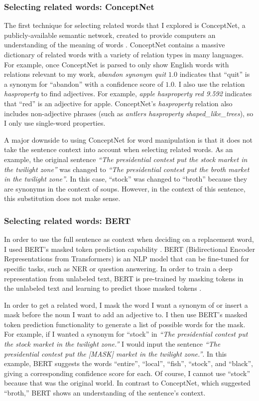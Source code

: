 \subsubsection{Selecting related words: ConceptNet}
The first technique for selecting related words that I explored is ConceptNet, a publicly-available semantic network, created to provide computers an understanding of the meaning of words \citep{conceptnet}. ConceptNet contains a massive dictionary of related words with a variety of relation types in many languages. For example, once ConceptNet is parsed to only show English words with relations relevant to my work, \textit{abandon synonym quit $1.0$} indicates that ``quit'' is a synonym for ``abandon'' with a confidence score of $1.0$. I also use the relation \textit{hasproperty} to find adjectives. For example, \textit{apple hasproperty red 9.592} indicates that ``red'' is an adjective for apple. ConceptNet's \textit{hasproperty} relation also includes non-adjective phrases (such as \textit{antlers hasproperty shaped\_like\_trees}), so I only use single-word properties.

A major downside to using ConceptNet for word manipulation is that it does not take the sentence context into account when selecting related words. As an example, the original sentence \textit{``The presidential contest put the stock market in the twilight zone''} was changed to \textit{``The presidential contest put the broth market in the twilight zone''}. In this case, ``stock'' was changed to ``broth'' because they are synonyms in the context of soups. However, in the context of this sentence, this substitution does not make sense.

\subsubsection{Selecting related words: BERT}
\label{sec:BERT}
In order to use the full sentence as context when deciding on a replacement word, I used BERT's masked token prediction capability \citep{BERT}. BERT (Bidirectional Encoder Representations from Transformers) is an NLP model that can be fine-tuned for specific tasks, such as NER or question answering. In order to train a deep representation from unlabeled text, BERT is pre-trained by masking tokens in the unlabeled text and learning to predict those masked tokens \citep{BERT}. 

In order to get a related word, I mask the word I want a synonym of or insert a mask before the noun I want to add an adjective to. I then use BERT's masked token prediction functionality to generate a list of possible words for the mask. For example, if I wanted a synonym for ``stock'' in \textit{``The presidential contest put the stock market in the twilight zone.''} I would input the sentence \textit{``The presidential contest put the [MASK] market in the twilight zone.''}. In this example, BERT suggests the words ``entire'', ``local'', ``fish'', ``stock'', and ``black'', giving a corresponding confidence score for each. Of course, I cannot use ``stock'' because that was the original world. In contrast to ConceptNet, which suggested ``broth,'' BERT shows an understanding of the sentence's context.

